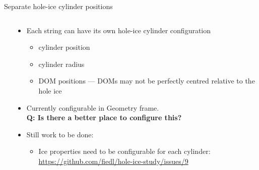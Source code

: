 
\begin{frame}[fragile]{Separate hole-ice cylinder positions}

  \begin{columns}
    \begin{column}{0.5\textwidth}


    \end{column}
    \begin{column}{0.5\textwidth}

      \begin{itemize}
        \item Each string can have its own hole-ice cylinder configuration
          \begin{itemize}
            \item cylinder position
            \item cylinder radius
            \item DOM positions --- DOMs may not be perfectly centred relative to the hole ice
          \end{itemize}

        \item Currently configurable in Geometry frame. \\

          \textbf{Q: Is there a better place to configure this?}

        \item Still work to be done:
          \begin{itemize}
            \item Ice properties need to be configurable for each cylinder:
                \tiny \url{https://github.com/fiedl/hole-ice-study/issues/9} \small
          \end{itemize}
      \end{itemize}


    \end{column}
  \end{columns}

\end{frame}


